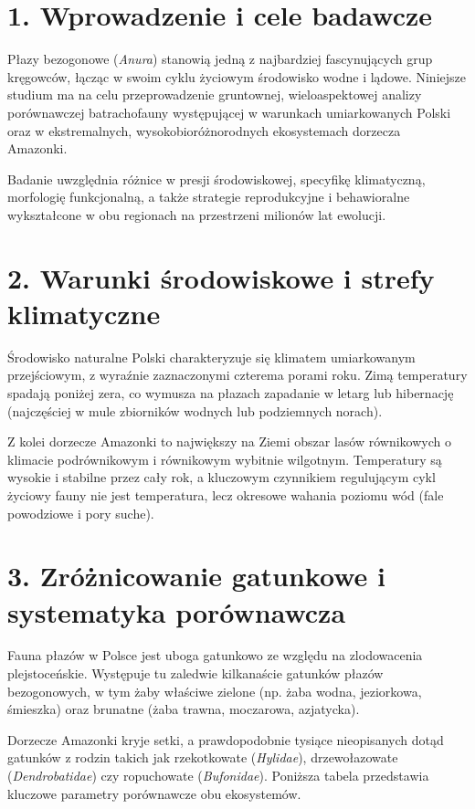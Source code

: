 \section*{1. Wprowadzenie i cele badawcze}
Płazy bezogonowe (\textit{Anura}) stanowią jedną z najbardziej fascynujących grup kręgowców, łącząc w swoim cyklu życiowym środowisko wodne i lądowe. Niniejsze studium ma na celu przeprowadzenie gruntownej, wieloaspektowej analizy porównawczej batrachofauny występującej w warunkach umiarkowanych Polski oraz w ekstremalnych, wysokobioróżnorodnych ekosystemach dorzecza Amazonki. 

Badanie uwzględnia różnice w presji środowiskowej, specyfikę klimatyczną, morfologię funkcjonalną, a także strategie reprodukcyjne i behawioralne wykształcone w obu regionach na przestrzeni milionów lat ewolucji.

\section*{2. Warunki środowiskowe i strefy klimatyczne}
Środowisko naturalne Polski charakteryzuje się klimatem umiarkowanym przejściowym, z wyraźnie zaznaczonymi czterema porami roku. Zimą temperatury spadają poniżej zera, co wymusza na płazach zapadanie w letarg lub hibernację (najczęściej w mule zbiorników wodnych lub podziemnych norach). 

Z kolei dorzecze Amazonki to największy na Ziemi obszar lasów równikowych o klimacie podrównikowym i równikowym wybitnie wilgotnym. Temperatury są wysokie i stabilne przez cały rok, a kluczowym czynnikiem regulującym cykl życiowy fauny nie jest temperatura, lecz okresowe wahania poziomu wód (fale powodziowe i pory suche).

\section*{3. Zróżnicowanie gatunkowe i systematyka porównawcza}
Fauna płazów w Polsce jest uboga gatunkowo ze względu na zlodowacenia plejstoceńskie. Występuje tu zaledwie kilkanaście gatunków płazów bezogonowych, w tym żaby właściwe zielone (np. żaba wodna, jeziorkowa, śmieszka) oraz brunatne (żaba trawna, moczarowa, azjatycka). 

Dorzecze Amazonki kryje setki, a prawdopodobnie tysiące nieopisanych dotąd gatunków z rodzin takich jak rzekotkowate (\textit{Hylidae}), drzewołazowate (\textit{Dendrobatidae}) czy ropuchowate (\textit{Bufonidae}). Poniższa tabela przedstawia kluczowe parametry porównawcze obu ekosystemów.

